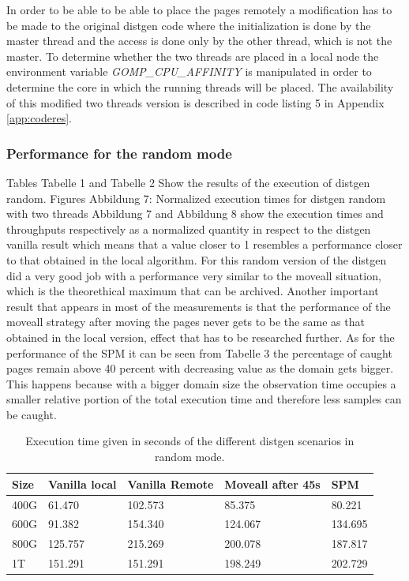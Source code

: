 In order to be able to be able to place the pages remotely a modification has to be made to the original distgen code where the initialization is done by the master thread and the access is done only by the other thread, which is not the master. To determine whether the two threads are placed in a local node the environment variable \textit{GOMP\_CPU\_AFFINITY} is manipulated in order to determine the core in which the running threads will be placed. The availability of this modified two threads version is described in code listing 5 in Appendix \ref{app:coderes}.


\subsubsection{Performance for the random mode}\label{subsection:res-dgrandom-2t-scens}

Tables Tabelle 1 and Tabelle 2 Show the results of the execution of distgen random. Figures Abbildung 7: Normalized execution times for distgen random with two threads Abbildung 7 and Abbildung 8 show the execution times and throughputs respectively as a normalized quantity in respect to the distgen vanilla result which means that a value closer to 1 resembles a performance closer to that obtained in the local algorithm. For this random version of the distgen did a very good job with a performance very similar to the moveall situation, which is the theorethical maximum that can be archived. Another important result that appears in most of the measurements is that the performance of the moveall strategy after moving the pages never gets to be the same as that obtained in the local version, effect that has to be researched further.
As for the performance of the SPM it can be seen from Tabelle 3 the percentage of caught pages remain above 40 percent with decreasing value as the domain gets bigger. This happens because with a bigger domain size the observation time occupies a smaller relative portion of the total execution time and therefore less samples can be caught.


\begin{table}
	\centering
		\begin{tabularx}{\textwidth}{|l|l|l|l|X|}
		\hline
			Size & Vanilla local & Vanilla Remote & Moveall after 45s & SPM \\
			\hline
			400G & 61.470 & 102.573 & 85.375 & 80.221\\
			\hline
			600G & 91.382 & 154.340 & 124.067 & 134.695\\
			\hline
			800G & 125.757 & 215.269 & 200.078 & 187.817\\
			\hline
			1T & 151.291 & 151.291 & 198.249 & 202.729\\
			\hline
		\end{tabularx}
		\caption{Execution time given in seconds of the different distgen scenarios in random mode.}
		\label{table:res-tbl-dgentimrdm2t}
\end{table}

